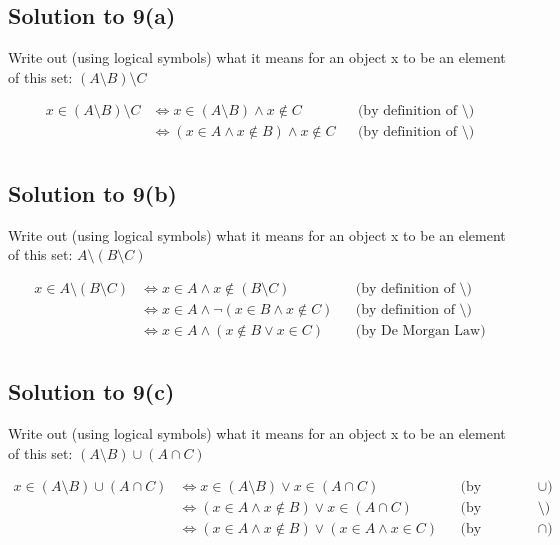 \documentclass{scrartcl}
\begin{document}
    \subsection*{Solution to 9(a)}
        Write out (using logical symbols) what it means for an object x to be an element of this set: $(A \setminus B) \setminus C$

        \begin{align*}
            x \in (A \setminus B) \setminus C
            &\Leftrightarrow x \in (A \setminus B) \wedge x \notin C
            && \text{(by definition of $\setminus$)} \\
            &\Leftrightarrow (x \in A \wedge x \notin B) \wedge x \notin C
            && \text{(by definition of $\setminus$)} \\
        \end{align*}

    \subsection*{Solution to 9(b)}
        Write out (using logical symbols) what it means for an object x to be an element of this set: $A \setminus (B \setminus C)$

        \begin{align*}
            x \in A \setminus (B \setminus C)
            &\Leftrightarrow x \in A \wedge x \notin (B \setminus C)
            && \text{(by definition of $\setminus$)} \\
            &\Leftrightarrow x \in A \wedge \neg (x \in B \wedge x \notin C)
            && \text{(by definition of $\setminus$)} \\
            &\Leftrightarrow x \in A \wedge (x \notin B \vee x \in C)
            && \text{(by De Morgan Law)} \\
        \end{align*}

    \subsection*{Solution to 9(c)}
        Write out (using logical symbols) what it means for an object x to be an element of this set: $(A \setminus B) \cup (A \cap C)$

        \begin{align*}
            x \in (A \setminus B) \cup (A \cap C)
            &\Leftrightarrow x \in (A \setminus B) \vee x \in (A \cap C)
            && \text{(by definition of $\cup$)} \\
            &\Leftrightarrow (x \in A \wedge x \notin B) \vee x \in (A \cap C)
            && \text{(by definition of $\setminus$)} \\
            &\Leftrightarrow (x \in A \wedge x \notin B) \vee (x \in A \wedge x \in C)
            && \text{(by definition of $\cap$)} \\
        \end{align*}
\end{document}
